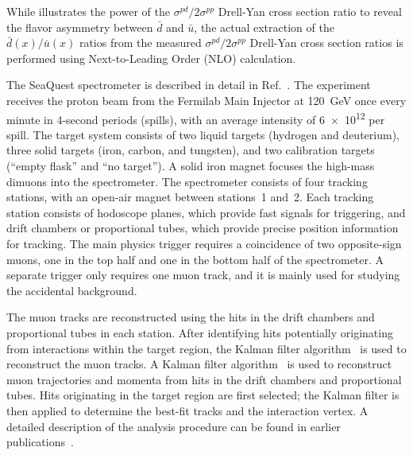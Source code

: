 \documentclass[reprint,aps,unsortedaddress,superscriptaddress,prl,floatfix,showpacs,linenumbers]{revtex4-2}
\begin{document}
While  illustrates the power of the $\sigma^{pd}/2\sigma^{pp}$ Drell-Yan cross section
ratio to reveal the flavor asymmetry between $\bar{d}$ and $\bar{u}$,
the actual extraction of the $\bar{d}\left(x\right) / \bar{u}\left(x\right)$
ratios from the measured $\sigma^{pd}/ 2 \sigma^{pp}$ Drell-Yan cross
section ratios is performed using Next-to-Leading Order (NLO)
calculation.

The SeaQuest spectrometer is described in detail in Ref.~\cite{aidala2019}.
The experiment receives the proton beam from the Fermilab Main
Injector at \SI{120}{\GeV}
once every minute in 4-second periods (spills), with an average intensity
of \num{6e12} per spill.
The target system consists of two liquid targets (hydrogen and deuterium),
three solid targets (iron, carbon, and tungsten), and two calibration
targets (``empty flask'' and ``no target'').
A solid iron magnet focuses the high-mass dimuons into the spectrometer.
The spectrometer consists of four tracking stations, with an open-air magnet between stations~1 and~2.
Each tracking station consists of hodoscope planes, which
provide fast signals for triggering,
and drift chambers or proportional tubes, which provide precise
position information for tracking.
The main physics trigger requires a coincidence of two opposite-sign muons,
one in the top half and one in the bottom half of the spectrometer.
A separate trigger only requires one muon track, and it is mainly used
for studying the accidental background.

The muon tracks are reconstructed using the hits in the drift chambers and proportional tubes in each station.
After identifying hits potentially originating from interactions within the target region,
the Kalman filter algorithm~\cite{kalman1960} is used to reconstruct the muon tracks.
A Kalman filter algorithm~\cite{kalman1960} is used to reconstruct muon trajectories and momenta from hits in the drift chambers and proportional tubes.
Hits originating in the target region are first selected; the Kalman filter is then applied to determine the best-fit tracks and the interaction vertex.
A detailed description of the analysis procedure can be found in earlier publications~\cite{dove2021,dove2023}.
\end{document}

